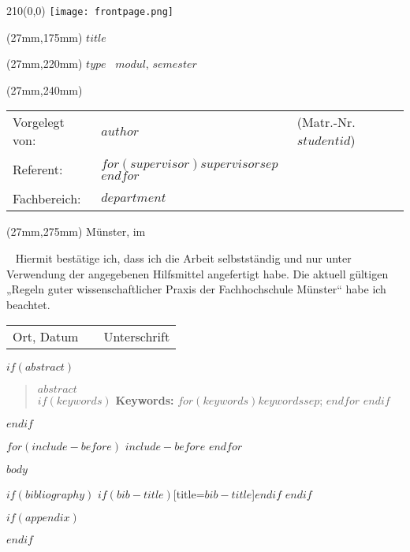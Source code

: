 \documentclass[10 pt,bibliography=totoc]{scrreprt}
\begin{document}
\begin{titlepage}
\begin{textblock}{210}(0,0)
	\texttt{[image: frontpage.png]}
\end{textblock}
\doublespacing
\begin{textblock*}{156mm}(27mm,175mm)
	\LARGE \textbf{$title$}
\end{textblock*}
\singlespacing
\begin{textblock*}{156mm}(27mm,220mm)
	\Large $type$ \ \textbf{$modul$}, $semester$
\end{textblock*}
\begin{textblock*}{156mm}(27mm,240mm)
	\normalsize
	\begin{tabularx}{120mm}{l X l}
		Vorgelegt von:&\textbf{$author$}&(Matr.-Nr. $studentid$)\\
		&&\\
		Referent:&\textbf{$for(supervisor)$$supervisor$$sep$ \newline $endfor$}\\
		&&\\
		Fachbereich:&\textbf{$department$}\\
	\end{tabularx}
\end{textblock*}
\begin{textblock*}{156mm}(27mm,275mm)
	Münster, im \makeatletter \month@ngerman \makeatother \ \the\year
\end{textblock*}
\end{titlepage}
\clearpage
\newpage
\mbox{~}
\clearpage
\newpage
\thispagestyle{empty}
\vspace*{10mm}
\normalsize
\doublespacing
Hiermit bestätige ich, dass ich die Arbeit selbstständig und nur unter Verwendung der angegebenen Hilfsmittel angefertigt habe. Die aktuell gültigen „Regeln guter wissenschaftlicher Praxis der Fachhochschule Münster“ habe ich beachtet.
\vspace{20mm}
\hspace{-1cm}
\begin{table}[h]
	\centering
	\begin{tabular}{p{50mm}p{50mm}p{50mm}}
		Ort, Datum& &Unterschrift
	\end{tabular}
\end{table}
\newpage

$if(abstract)$
\begin{abstract}
$abstract$\\
$if(keywords)$
\textbf{Keywords:} $for(keywords)$$keywords$$sep$; $endfor$
$endif$
\end{abstract}
$endif$

$for(include-before)$
$include-before$
$endfor$

\tableofcontents
\listoftables
\listoffigures

$body$

$if(bibliography)$
\printbibliography$if(bib-title)$[title=$bib-title$]$endif$
$endif$

$if(appendix)$

$endif$
\end{document}
